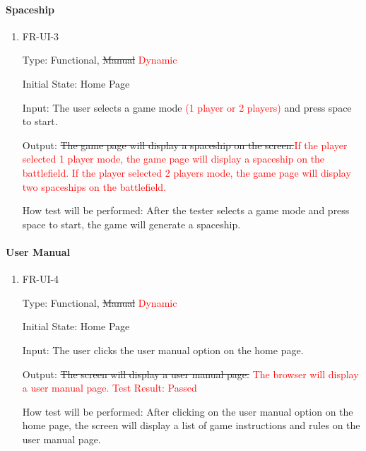 \documentclass[12pt, titlepage]{article}
\begin{document}
\paragraph{Spaceship}
\begin{enumerate}					
\item{FR-UI-3\\}

Type: Functional, \sout{Manual} \textcolor{red}{Dynamic}
					
Initial State: Home Page
					
Input: The user selects a game mode \textcolor{red}{(1 player or 2 players)} and press space to start.
					
Output: \sout{The game page will display a spaceship on the screen.}\textcolor{red}{If the player selected 1 player mode, the game page
will display a spaceship on the battlefield. If the player selected 2 players mode, the game page will display two spaceships on the battlefield.
}
					
How test will be performed:  After the tester selects a game mode and press space to start, the game will generate a spaceship.

\end{enumerate}

\paragraph{User Manual}
\begin{enumerate}					
\item{FR-UI-4\\}

Type: Functional, \sout{Manual} \textcolor{red}{Dynamic}
					
Initial State: Home Page
					
Input: The user clicks the user manual option on the home page.
					
Output: \sout{The screen will display a user manual page.} \textcolor{red}{The browser will display a user manual page.
Test Result: Passed}
					
How test will be performed:  After clicking on the user manual option on the home page, the screen will display a list of game instructions and rules on the user manual page.

\end{enumerate}
\end{document}
